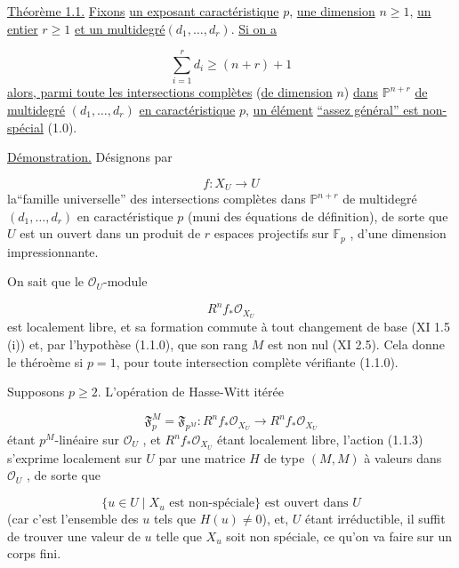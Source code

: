\underline{Théorème 1.1.} \underline{Fixons} \underline{un exposant caractéristique} $p$, \underline{une dimension} $n \geq 1$, \underline{un entier} $r \geq 1$ \underline{et un multidegré}$(d_1,\dots,d_r)$. \underline{Si on a}

\begin{equation}\tag{1.1.0}
\sum_{i=1}^{r} d_i \geq (n+r)+1
\end{equation}
\underline{alors, parmi toute les intersections complètes} (\underline{de dimension} $n$) \underline{dans} $\mathbb{P}^{n+r}$ \underline{de multidegré} $(d_1,\dots,d_r)$ \underline{en caractéristique} $p$, \underline{un élément} \underline{``assez général'' est non-spécial} (1.0).

\underline{Démonstration.} Désignons par

\begin{equation}\tag{1.1.1}
f : X_U \longrightarrow U
\end{equation}
la``famille universelle'' des intersections complètes dans $\mathbb{P}^{n+r}$ de
multidegré $(d_1,\dots,d_r)$ en caractéristique $p$ (muni des équations de définition), de sorte que $U$ est un ouvert dans un produit de $r$ espaces projectifs sur $\mathbb{F}_p$ , d'une dimension impressionnante.

On sait que le $\mathcal{O}_U$-module

\begin{equation}\tag{1.1.2}
R^n f_* \mathcal{O}_{X_U}
\end{equation}
est localement libre, et sa formation commute à tout changement de base (XI 1.5 (i)) et, par l'hypothèse (1.1.0), que son rang $M$ est non nul (XI 2.5). Cela donne le théroème si $p = 1$, pour toute intersection complète vérifiante (1.1.0).

Supposons $p \geq 2$. L'opération de Hasse-Witt itérée

\begin{equation}\tag{1.1.3}
\mathfrak{F}_p^M = \mathfrak{F}_{p^M} : R^n f_* \mathcal{O}_{X_U} \longrightarrow R^n f_* \mathcal{O}_{X_U}
\end{equation}
étant $p^M$-linéaire sur $\mathcal{O}_U$ , et $R^n f_* \mathcal{O}_{X_U}$ étant localement libre, l'action (1.1.3) s'exprime localement sur $U$ par une matrice $H$ de type $(M,M)$ à valeurs dans $\mathcal{O}_U$ , de sorte que

\begin{equation}\tag{1.1.4}
\{ u \in U \mid X_u \mbox{ est non-spéciale}\} \mbox{ est ouvert dans } U
\end{equation}
(car c'est l'ensemble des $u$ tels que $H(u) \neq 0$), et, $U$ étant irréductible, il suffit de trouver une valeur de $u$ telle que $X_u$ soit non spéciale, ce qu'on va faire sur un corps fini.

